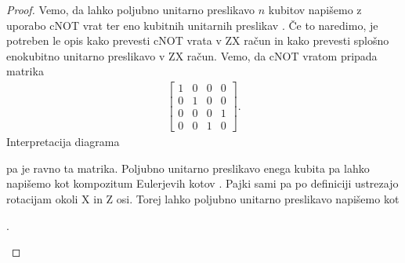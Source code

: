 \documentclass[mat1]{fmfdelo}
\begin{document}
\begin{proof}
Vemo, da lahko poljubno unitarno preslikavo \(n\) kubitov napišemo z uporabo \textsf{cNOT} vrat ter eno kubitnih unitarnih preslikav \cite[Izrek 5.26]{mathforqm}. Če to naredimo, je potreben le opis kako prevesti \textsf{cNOT} vrata v ZX račun in kako prevesti splošno enokubitno unitarno preslikavo v ZX račun. Vemo, da \textsf{cNOT} vratom pripada matrika
\begin{align*}
    \begin{bmatrix}
        1&0&0&0\\
        0&1&0&0\\
        0&0&0&1\\
        0&0&1&0
    \end{bmatrix}.
\end{align*}
Interpretacija diagrama
\begin{center}
\end{center}
pa je ravno ta matrika. Poljubno unitarno preslikavo enega kubita pa lahko napišemo kot kompozitum Eulerjevih kotov \cite[Izrek 5.11]{mathforqm}. Pajki sami pa po definiciji ustrezajo rotacijam okoli X in Z osi. Torej lahko poljubno unitarno preslikavo napišemo kot
\begin{center}
    .
\end{center}

\end{proof}
\end{document}
